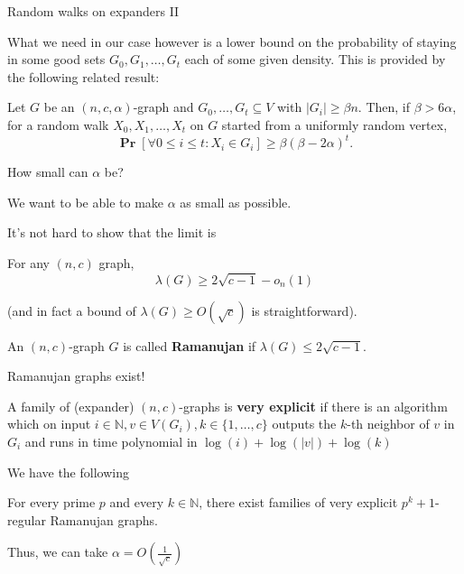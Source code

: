 \documentclass[10pt]{beamer}
\newcommand{\N}{\mathbb{N}}
\renewcommand{\P}{\operatorname*{\mathbf{Pr}}}
\renewcommand{\l}{\left}
\renewcommand{\r}{\right}
\renewcommand{\a}{\alpha}
\renewcommand{\b}{\beta}
\begin{document}
\begin{frame}{Random walks on expanders II}

  What we need in our case however is a lower bound on the probability
  of staying in some good sets $G_0,G_1,\ldots,G_t$ each of some given
  density. This is provided by the following related result:

  \bigskip\bigskip

  \begin{theorem} Let $G$ be an $(n,c,\a)$-graph and
    $G_0,\ldots,G_t\subseteq V$ with $|G_i|\geq \b n$. Then, if $\b>6\a$,
    for a random walk $X_0,X_1,\ldots,X_t$ on $G$ started from a
    uniformly random vertex,
    \[
    \P\l[\forall 0\leq i\leq t: X_i\in G_i\r]\geq \b(\b-2\a)^t.
    \]
  \end{theorem}

\end{frame}

\begin{frame}{How small can $\a$ be?}

We want to be able to make $\a$ as small as possible.

\pause\bigskip\bigskip

It's not hard to show that the limit is
\begin{theorem}
  For any $(n,c)$ graph,
  \[
  \lambda(G)\geq 2\sqrt{c-1}-o_n(1)
  \]
\end{theorem}
(and in fact a bound of $\lambda(G)\geq O(\sqrt{c})$ is
straightforward).

\pause\bigskip\bigskip

\begin{definition}
  An $(n,c)$-graph $G$ is called \textbf{Ramanujan} if
  $\lambda(G)\leq 2\sqrt{c-1}$.
\end{definition}
\end{frame}

\begin{frame}{Ramanujan graphs exist!}
  \begin{definition}
    A family of (expander) $(n,c)$-graphs is \textbf{very explicit} if
    there is an algorithm which on input $i\in\N,v\in
    V(G_i),k\in\{1,\ldots,c\}$ outputs the $k$-th neighbor of $v$ in
    $G_i$ and runs in time polynomial in $\log(i)+\log(|v|)+\log(k)$
  \end{definition}

  \pause\bigskip\bigskip

  We have the following
  \begin{theorem}
     For every prime $p$
    and every $k\in\N$, there exist families of very explicit
    $p^k+1$-regular Ramanujan graphs.
  \end{theorem}

  \pause\bigskip

  Thus, we can take $\a=O \l(\frac{1}{\sqrt{c}}\r)$
\end{frame}
\end{document}
